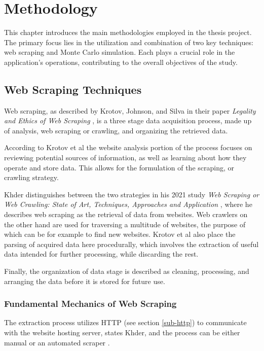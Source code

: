 \documentclass{thesis-ekf}
\theoremstyle{definition}
\theoremstyle{remark}
\begin{document}
\chapter{Methodology}
This chapter introduces the main methodologies employed in the thesis project. The primary focus lies in the utilization and combination of two key techniques: web scraping and Monte Carlo simulation. Each plays a crucial role in the application's operations, contributing to the overall objectives of the study.

\section{Web Scraping Techniques} \label{sec-web-scraping}
Web scraping, as described by Krotov, Johnson, and Silva in their paper \emph{Legality and Ethics of Web Scraping} \cite{Krotov}, is a three stage data acquisition process, made up of analysis, web scraping or crawling, and organizing the retrieved data. 

According to Krotov et al the website analysis portion of the process focuses on reviewing potential sources of information, as well as learning about how they operate and store data. This allows for the formulation of the scraping, or crawling strategy.

Khder distinguishes between the two strategies in his 2021 study \emph{Web Scraping or Web Crawling: State of Art, Techniques, Approaches and	Application} \cite{Khder}, where he describes web scraping as the retrieval of data from websites. Web crawlers on the other hand are used for traversing a multitude of websites, the purpose of which can be for example to find new websites. Krotov et al also place the parsing of acquired data here procedurally, which involves the extraction of useful data intended for further processing, while discarding the rest. 

Finally, the organization of data stage is described as cleaning, processing, and arranging the data before it is stored for future use.

\subsection{Fundamental Mechanics of Web Scraping}
The extraction process utilizes HTTP (see section \ref{sub-http}) to communicate with the website hosting server, states Khder, and the process can be either manual or an automated scraper \cite{Khder}. 
\end{document}
